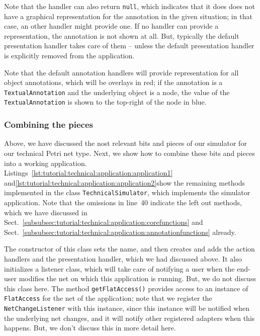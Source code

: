Note that the handler can also return {\tt null}, which indicates that it does
does not have a graphical representation for the annotation in the given
situation; in that case, an other handler might provide one. If no handler
can provide a representation, the annotation is not shown at all. But, typically
the default presentation handler takes care of them -- unless the default
presentation handler is explicitly removed from the application.

Note that the default annotation handlers will provide representation for all
object annotations, which will be overlays in red; if the annotation is a {\tt TextualAnnotation}
and the underlying object is a node, the value of the  {\tt TextualAnnotation}
is shown to the top-right of the node in blue.

\subsubsection{Combining the pieces}
\label{subsubsec:tutorial:technical:application:combination}

Above, we have discussed the nost relevant bits and pieces of our simulator for
our technical Petri net type. Next, we show how to combine these bits and pieces
into a working application.
Listings~\ref{lst:tutorial:technical:application:application1} 
and\ref{lst:tutorial:technical:application:application2}show the remaining
methods implemented in the class {\tt TechnicalSimulator}, which implements 
the simulator application. Note that the omissions in line~40 indicate the left
out methods, which we have discussed in
Sect.~\ref{subsubsec:tutorial:technical:application:corefunctions} and
Sect.~\ref{subsubsec:tutorial:technical:application:annotationfunctions}
already.

The constructor of this class sets the name, and then creates and adds the
action handlers and the presentation handler, which we had discussed above.
It also initializes a listener class, which will take care of notifying a user
when the end-user modifies the net on which this application is running. But, we
do not discuss this class here. The method {\tt getFlatAccess()} provides access
to an instance of {\tt FlatAccess} for the net of the application; note that we
register the {\tt NetChangeListener} with this instance, since this
instance will be notified when the underlying net changes, and it will notify
other registered adapters when this happens. But, we don't discuss this in more
detail here.


